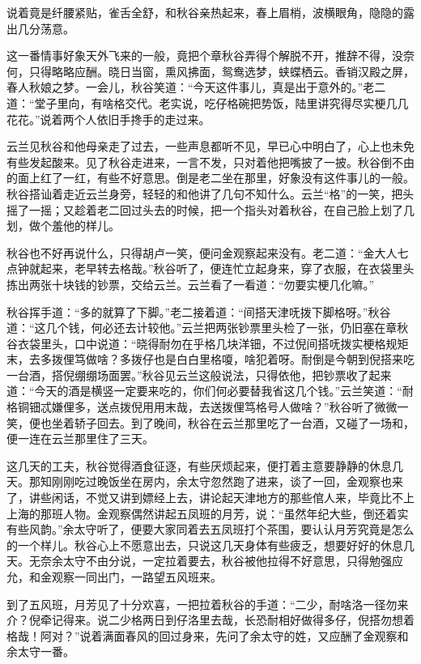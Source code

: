 \documentclass[12pt,UTF8]{ctexbook}
\begin{document}
{{{说着竟是纤腰紧贴，雀舌全舒，和秋谷亲热起来，春上眉梢，波横眼角，隐隐的露出几分荡意。

这一番情事好象天外飞来的一般，竟把个章秋谷弄得个解脱不开，推辞不得，没奈何，只得略略应酬。晓日当窗，熏风拂面，鸳鸯选梦，蛱蝶栖云。香销汉殿之屏，春人秋娘之梦。一会儿，秋谷笑道：“今天这件事儿，真是出于意外的。”老二道：“堂子里向，有啥格交代。老实说，吃仔格碗把势饭，陆里讲究得尽实梗几几花花。”说着两个人依旧手搀手的走过来。

云兰见秋谷和他母亲走了过去，一些声息都听不见，早已心中明白了，心上也未免有些发起酸来。见了秋谷走进来，一言不发，只对着他把嘴披了一披。秋谷倒不由的面上红了一红，有些不好意思。倒是老二坐在那里，好象没有这件事儿的一般。秋谷搭讪着走近云兰身旁，轻轻的和他讲了几句不知什么。云兰“格”的一笑，把头摇了一摇；又趁着老二回过头去的时候，把一个指头对着秋谷，在自己脸上划了几划，做个羞他的样儿。

秋谷也不好再说什么，只得胡卢一笑，便问金观察起来没有。老二道：“金大人七点钟就起来，老早转去格哉。”秋谷听了，便连忙立起身来，穿了衣服，在衣袋里头拣出两张十块钱的钞票，交给云兰。云兰看了一看道：“勿要实梗几化嘛。”

秋谷挥手道：“多的就算了下脚。”老二接着道：“间搭天津呒拨下脚格呀。”秋谷道：“这几个钱，何必还去计较他。”云兰把两张钞票里头检了一张，仍旧塞在章秋谷衣袋里头，口中说道：“晓得耐勿在乎格几块洋钿，不过倪间搭呒拨实梗格规矩末，去多拨俚笃做啥？多拨仔也是白白里格嗄，啥犯着呀。耐倒是今朝到倪搭来吃一台酒，搭倪绷绷场面罢。”秋谷见云兰这般说法，只得依他，把钞票收了起来道：“今天的酒是横竖一定要来吃的，你们何必要替我省这几个钱。”云兰笑道：“耐格铜钿忒嫌俚多，送点拨倪用用末哉，去送拨俚笃格号人做啥？”秋谷听了微微一笑，便也坐着轿子回去。到了晚间，秋谷在云兰那里吃了一台酒，又碰了一场和，便一连在云兰那里住了三天。

这几天的工夫，秋谷觉得酒食征逐，有些厌烦起来，便打着主意要静静的休息几天。那知刚刚吃过晚饭坐在房内，余太守忽然跑了进来，谈了一回，金观察也来了，讲些闲话，不觉又讲到嫖经上去，讲论起天津地方的那些倌人来，毕竟比不上上海的那班人物。金观察偶然讲起五凤班的月芳，说：“虽然年纪大些，倒还着实有些风韵。”余太守听了，便要大家同着去五凤班打个茶围，要认认月芳究竟是怎么的一个样儿。秋谷心上不愿意出去，只说这几天身体有些疲乏，想要好好的休息几天。无奈余太守不由分说，一定拉着要去，秋谷被他拉得不好意思，只得勉强应允，和金观察一同出门，一路望五风班来。

到了五风班，月芳见了十分欢喜，一把拉着秋谷的手道：“二少，耐啥洛一径勿来介？倪牵记得来。说二少格两日到仔洛里去哉，长恐耐相好做得多仔，倪搭勿想着格哉！阿对？”说着满面春风的回过身来，先问了余太守的姓，又应酬了金观察和余太守一番。

}}}
\end{document}
